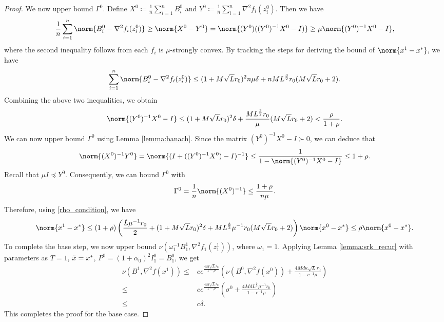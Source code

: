 \begin{proof}
    We now upper bound $\Gamma^0$. Define $X^0 \coloneqq \frac{1}{n} \sum_{i=1}^n B_i^0$ and $Y^0 \coloneqq \frac{1}{n} \sum_{i=1}^n \nabla^2 f_i (z_i^0)$. Then we have
    \begin{equation*}
        \frac{1}{n} \sum_{i=1}^n \norm{B_i^0 - \nabla^2 f_i (z_i^0)} \geq \norm{X^0 - Y^0} = \norm{(Y^0)((Y^0)^{-1} X^0 - I)} \geq \mu \norm{(Y^0)^{-1} X^0 - I},
    \end{equation*}
    where the second inequality follows from each $f_i$ is $\mu$-strongly convex. By tracking the steps for deriving the bound of $\norm{x^1 - x^*}$, we have
    \begin{equation*}
        \sum_{i=1}^n \norm{B_i^0 - \nabla^2 f_i (z_i^0)} \leq (1 + M \sqrt{L} r_0)^2 n \mu \delta + n M L^{\frac{3}{2}} r_0 (M \sqrt{L} r_0 + 2).
    \end{equation*}
    Combining the above two inequalities, we obtain
    \begin{equation*}
        \norm{(Y^0)^{-1} X^0 - I} \leq (1 + M \sqrt{L} r_0)^2  \delta +  \frac{M L^{\frac{3}{2}} r_0}{\mu} (M \sqrt{L} r_0 + 2) < \frac{\rho}{1 + \rho}.
    \end{equation*}
    We can now upper bound $\Gamma^0$ using Lemma \ref{lemma:banach}. Since the matrix $(Y^0)^{-1}X^0 - I \succ 0$, we can deduce that
    \begin{equation*}
        \norm{(X^0)^{-1} Y^0} = \norm{(I + ((Y^0)^{-1} X^0)- I)^{-1}} \leq \frac{1}{1 - \norm{(Y^0)^{-1} X^0 - I}} \leq 1 + \rho.
    \end{equation*}
    Recall that $\mu I \preceq Y^0$. Consequently, we can bound $\Gamma^0$ with
    \begin{equation*}
        \Gamma^0 = \frac{1}{n} \norm{(X^0)^{-1}} \leq \frac{1+\rho}{n \mu}.
    \end{equation*}
    Therefore, using \eqref{rho_condition}, we have
    \begin{equation*}
         \norm{x^1 - x^*} 
         \leq  (1 + \rho) \left(\frac{\Tilde{L} \mu^{-1} r_0}{2} + (1 + M \sqrt{L} r_0)^2  \delta +  M L^{\frac{3}{2}} \mu^{-1} r_0 (M \sqrt{L} r_0 + 2) \right) \norm{x^0 - x^*} \leq \rho \norm{x^0 - x^*}.
    \end{equation*}
    To complete the base step, we now upper bound $\nu(\omega_{1}^{-1} B_{1}^1, \nabla^2 f_{1}(z_{1}^1))$, where $\omega_1 = 1$. Applying Lemma \ref{lemma:srk_recur} with parameters as $T=1$, $\Tilde{x} = x^*$, $P^0 = (1 + \alpha_0)^2 I_1^0 = B_1^0$, we get
    \begin{align*}
          \nu(B^1, \nabla^2 f(x^1))  \leq &  c e^ {\frac{4 M \sqrt{L}  r_0}{1 - \rho} } \left( \nu (B^{0}, \nabla^2 f(x^{0})) +  \frac{4 M d \kappa \sqrt{L} r_0 }{1 - c^{-1} \rho}  \right) \\
          \leq & c e^ {\frac{4 M \sqrt{L}  r_0}{1 - \rho} } \left( \sigma^0 +  \frac{4 M d  L^{\frac{3}{2}} \mu^{-1} r_0 }{1 - c^{-1} \rho}  \right) \\
          \leq & c \delta.
    \end{align*}
    This completes the proof for the base case.
    

\end{proof}
